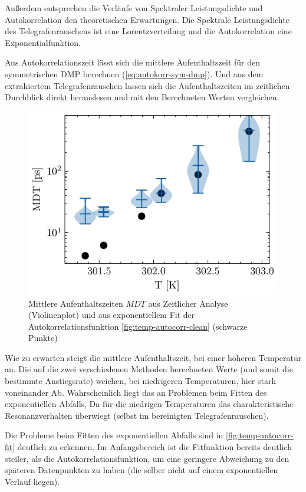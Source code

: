 \documentclass[main.tex]{subfiles}
\begin{document}
Außerdem entsprechen die Verläufe von Spektraler Leistungsdichte und Autokorrelation den theoretischen Erwartungen. Die Spektrale Leistungsdichte des Telegrafenrauschens ist eine Lorentzverteilung und die Autokorrelation eine Exponentialfunktion.

Aus Autokorrelationszeit lässt sich die mittlere Aufenthaltszeit für den symmetrischen DMP berechnen (\cref{eq:autokorr-sym-dmp}).
Und aus dem extrahiertem Telegrafenrauschen lassen sich die Aufenthaltszeiten im zeitlichen Durchblick direkt herauslesen und mit den Berechneten Werten vergleichen. 

\begin{figure}[H]
    \centering
    \includegraphics{bilder/plots/temp_comparison/mean_dwell_time_comparison.pdf}
    \caption{Mittlere Aufenthaltszeiten $MDT$ aus Zeitlicher Analyse (Violinenplot) und aus exponentiellem Fit der Autokorrelationsfunktion \cref{fig:temp-autocorr-clean} (schwarze Punkte)}\label{fig:temp-mdt-comp}
\end{figure}

Wie zu erwarten steigt die mittlere Aufenthaltszeit, bei einer höheren Temperatur an. Die auf die zwei verschiedenen Methoden berechneten Werte (und somit die bestimmte Anstiegsrate) weichen, bei niedrigeren Temperaturen, hier stark voneinander Ab. 
Wahrscheinlich liegt das an Problemen beim Fitten des exponentiellen Abfalls, Da für die niedrigen Temperaturen das charakteristische Resonanzverhalten überwiegt (selbst im bereinigten Telegrafenrauschen).


Die Probleme beim Fitten des exponentiellen Abfalls sind in \cref{fig:temp-autocorr-fit} deutlich zu erkennen. Im Anfangsbereich ist die Fitfunktion bereits deutlich steiler, als die Autokorrelationsfunktion, um eine geringere Abweichung zu den späteren Datenpunkten zu haben (die selber nicht auf einem exponentiellen Verlauf liegen).
\end{document}
